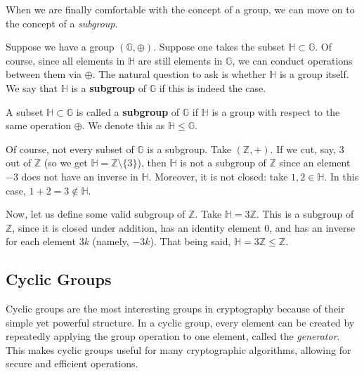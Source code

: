 \documentclass[../lecture-notes-148x210.tex]{subfiles}
\begin{document}
When we are finally comfortable with the concept of a group, we can move on to the concept of a \textit{subgroup}. 

Suppose we have a group $(\mathbb{G},\oplus)$. Suppose one takes the subset 
$\mathbb{H} \subset \mathbb{G}$. Of course, since all elements in $\mathbb{H}$ are still 
elements in $\mathbb{G}$, we can conduct operations between them via $\oplus$. 
The natural question to ask is whether $\mathbb{H}$ is a group itself. We say that 
$\mathbb{H}$ is a \textbf{subgroup} of $\mathbb{G}$ if this is indeed the case.

\begin{definition}
    A subset $\mathbb{H} \subset \mathbb{G}$ is called a \textbf{subgroup} of
    $\mathbb{G}$ if $\mathbb{H}$ is a group with respect to the same operation
    $\oplus$. 
    We denote this as $\mathbb{H} \leq \mathbb{G}$.
\end{definition}

\begin{example}
    Of course, not every subset of $\mathbb{G}$ is a subgroup. Take $(\mathbb{Z}, +)$. If we cut, say, $3$ out of 
    $\mathbb{Z}$ (so we get $\mathbb{H} = \mathbb{Z} \setminus \{3\}$), then $\mathbb{H}$ is not a subgroup of 
    $\mathbb{Z}$ since an element $-3$ does not have an inverse in $\mathbb{H}$. Moreover, it is not closed: 
    take $1,2 \in \mathbb{H}$. In this case, $1+2 = 3 \notin \mathbb{H}$.
\end{example}

\begin{example}
    Now, let us define some valid subgroup of $\mathbb{Z}$. Take $\mathbb{H} =
    3\mathbb{Z}$. This is a subgroup of $\mathbb{Z}$, since it is closed under
    addition, has an identity element $0$, and has an inverse for each element
    $3k$ (namely, $-3k$). That being said, $\mathbb{H} = 3\mathbb{Z} \leq \mathbb{Z}$.
\end{example}

\subsection{Cyclic Groups}

Cyclic groups are the most interesting groups in cryptography because of their
simple yet powerful structure. In a cyclic group,
every element can be created by repeatedly applying the group operation to one
element, called the \emph{generator}. This makes cyclic groups useful for many
cryptographic algorithms, allowing for secure and efficient operations. 
\end{document}
